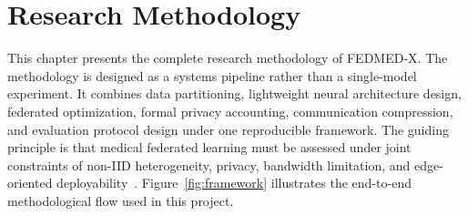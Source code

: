 \chapter{Research Methodology}

This chapter presents the complete research methodology of FEDMED-X. The
methodology is designed as a systems pipeline rather than a single-model
experiment. It combines data partitioning, lightweight neural architecture
design, federated optimization, formal privacy accounting, communication
compression, and evaluation protocol design under one reproducible
framework. The guiding principle is that medical federated learning must be
assessed under joint constraints of non-IID heterogeneity, privacy, bandwidth
limitation, and edge-oriented deployability~\cite{guan2024federated,
ghosh2026advancements,zhou2025federated}. Figure~\ref{fig:framework}
illustrates the end-to-end methodological flow used in this project.

